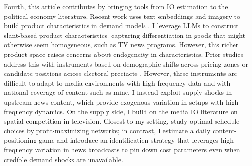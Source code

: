 \documentclass[12pt]{article}
\begin{document}

Fourth, this article contributes by bringing tools from IO estimation to the political economy literature. Recent work uses text embeddings and imagery to build product characteristics in demand models \citep{compiani2025demandestimationtextimage}. I leverage LLMs to construct slant-based product characteristics, capturing differentiation in goods that might otherwise seem homogeneous, such as TV news programs. However, this richer product space raises concerns about endogeneity in characteristics. Prior studies address this with instruments based on demographic shifts across pricing zones \citep{fan} or candidate positions across electoral precincts \citep{longuet-marx2025party}. However, these instruments are difficult to adapt to media environments with high-frequency data and with national coverage of content such as mine. I instead exploit supply shocks in upstream news content, which provide exogenous variation in setups with high-frequency dynamics. On the supply side, I build on the media IO literature on spatial competition in television. Closest to my setting, \citet{Goettler2001SpatialCI} study optimal schedule choices by profit-maximizing networks; in contrast, I estimate a daily content-positioning game and introduce an identification strategy that leverages high-frequency variation in news broadcasts to pin down cost parameters even when credible demand shocks are unavailable.
\end{document}
